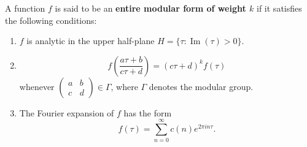 A function $f$ is said to be an \textbf{entire modular form of weight $k$} if it satisfies the following conditions:

\begin{enumerate}
\item[(a)] $f$ is analytic in the upper half-plane $H = \{\tau : \operatorname{Im}(\tau) > 0\}$.
\item[(b)] $$f\left(\frac{a\tau + b}{c\tau + d}\right) = (c\tau + d)^k f(\tau)$$ whenever $\begin{pmatrix} a & b \\ c & d \end{pmatrix} \in \Gamma$, where $\Gamma$ denotes the modular group.
\item[(c)] The Fourier expansion of $f$ has the form $$f(\tau) = \sum_{n=0}^{\infty} c(n)e^{2\pi i n\tau}.$$
\end{enumerate}
